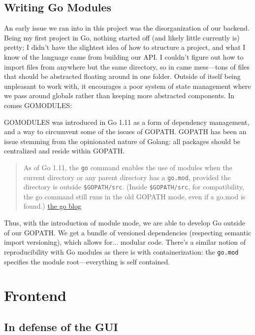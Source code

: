 \documentclass[11pt, twoside, reqno]{book}
\begin{document}
\section{Writing Go Modules}

An early issue we ran into in this project was the disorganization of our backend. Being my first project in Go, nothing started off (and likely little currently is) pretty; I didn't have the slightest idea of how to structure a project, and what I know of the language came from building our API. I couldn't figure out how to import files from anywhere but the same directory, so in came mess—tons of files that should be abstracted floating around in one folder. Outside of itself being unpleasant to work with, it encourages a poor system of state management where we pass around globals rather than keeping more abstracted components. In comes GOMODULES:

GOMODULES was introduced in Go 1.11 as a form of dependency management, and a way to circumvent some of the issues of GOPATH. GOPATH has been an issue stemming from the opinionated nature of Golang: all packages should be centralized and reside within GOPATH.

\begin{quote}
As of Go 1.11, the \texttt{go} command enables the use of modules when the current directory or any parent directory has a \texttt{go.mod}, provided the directory is outside \texttt{\$GOPATH/src}. (Inside \texttt{\$GOPATH/src}, for compatibility, the go command still runs in the old GOPATH mode, even if a go.mod is found.) \href{https://blog.golang.org/using-go-modules}{the go blog}
\end{quote}

Thus, with the introduction of module mode, we are able to develop Go outside of our GOPATH. We get a bundle of versioned dependencies (respecting semantic import versioning), which allows for... modular code. There's a similar notion of reproducibility with Go modules as there is with containerization: the \texttt{go.mod} specifies the module root—everything is self contained.

\chapter{Frontend}

\section{In defense of the GUI}
\end{document}
